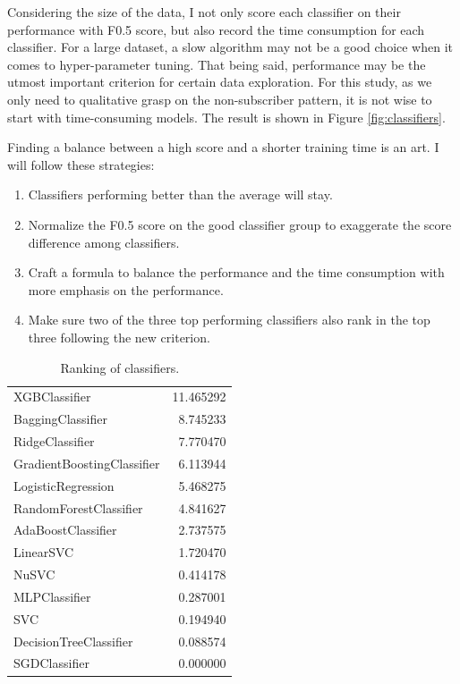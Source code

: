\documentclass[a4paper]{article}
\begin{document}
			Considering the size of the data, I not only score each classifier on their performance with F0.5 score, but also record the time consumption for each classifier. For a large dataset, a slow algorithm may not be a good choice when it comes to hyper-parameter tuning. That being said, performance may be the utmost important criterion for certain data exploration. For this study, as we only need to qualitative grasp on the non-subscriber pattern, it is not wise to start with time-consuming models. The result is shown in Figure \ref{fig:classifiers}.
			
			Finding a balance between a high score and a shorter training time is an art. I will follow these strategies:
			
			\begin{enumerate}
				\item Classifiers performing better than the average will stay.
				\item Normalize the F0.5 score on the good classifier group to exaggerate the score difference among classifiers.
				\item Craft a formula to balance the performance and the time consumption with more emphasis on the performance.
				\item Make sure two of the three top performing classifiers also rank in the top three following the new criterion.
			\end{enumerate}
							
			\begin{table}
				\centering
				\begin{tabular}{ l r }
					XGBClassifier              &   11.465292 \\
					BaggingClassifier          &   8.745233 \\
					RidgeClassifier            &   7.770470 \\
					GradientBoostingClassifier &   6.113944 \\
					LogisticRegression         &   5.468275 \\
					RandomForestClassifier     &   4.841627 \\
					AdaBoostClassifier         &   2.737575 \\
					LinearSVC                  &   1.720470 \\
					NuSVC                      &   0.414178 \\
					MLPClassifier              &   0.287001 \\
					SVC                        &   0.194940 \\
					DecisionTreeClassifier     &   0.088574 \\
					SGDClassifier              &   0.000000	
				\end{tabular}				
				\caption{Ranking of classifiers.\label{cls_ranking}}
			\end{table}
			
\end{document}
